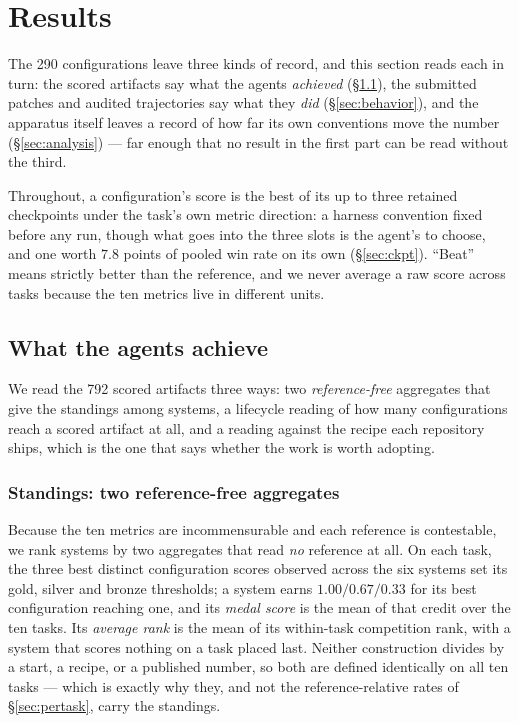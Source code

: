\section{Results}
\label{sec:experiments}

The 290 configurations leave three kinds of record, and this section reads each in turn: the scored
artifacts say what the agents \emph{achieved} (\S\ref{sec:results}), the submitted patches and audited
trajectories say what they \emph{did} (\S\ref{sec:behavior}), and the apparatus itself leaves a record
of how far its own conventions move the number (\S\ref{sec:analysis}) --- far enough that no result in
the first part can be read without the third.

Throughout, a configuration's score is the best of its up to three retained checkpoints under the
task's own metric direction: a harness convention fixed before any run, though what goes into the
three slots is the agent's to choose, and one worth $7.8$ points of pooled win rate on its own
(\S\ref{sec:ckpt}). ``Beat'' means strictly better than the reference, and we never average a raw
score across tasks because the ten metrics live in different units.

\subsection{What the agents achieve}
\label{sec:results}

We read the 792 scored artifacts three ways: two \emph{reference-free} aggregates that give the
standings among systems, a lifecycle reading of how many configurations reach a scored artifact at
all, and a reading against the recipe each repository ships, which is the one that says whether the
work is worth adopting.

\subsubsection{Standings: two reference-free aggregates}
\label{sec:standings}

Because the ten metrics are incommensurable and each reference is contestable, we rank systems by two
aggregates that read \emph{no} reference at all. On each task, the three best distinct configuration
scores observed across the six systems set its gold, silver and bronze thresholds; a system earns
$1.00/0.67/0.33$ for its best configuration reaching one, and its \emph{medal score} is the mean of
that credit over the ten tasks. Its \emph{average rank} is the mean of its within-task competition
rank, with a system that scores nothing on a task placed last. Neither construction divides by a start, a recipe, or a published
number, so both are defined identically on all ten tasks --- which is exactly why they, and not the
reference-relative rates of \S\ref{sec:pertask}, carry the standings.

